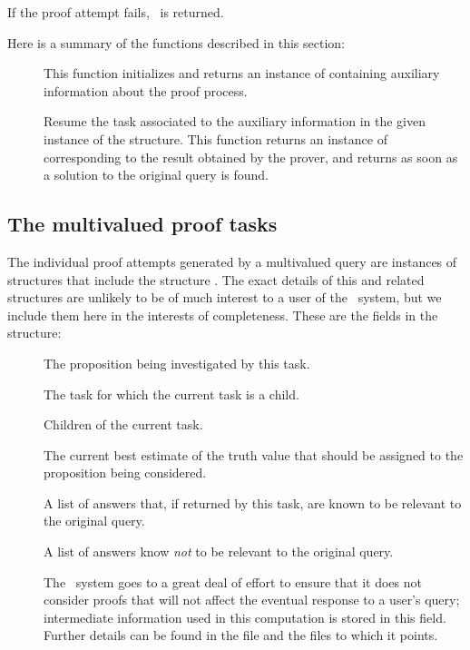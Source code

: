 If the proof attempt fails, \NIL\ is returned.

Here is a summary of the functions described in this section:

\begin{description}
 \item [] This function
initializes and returns an instance of  containing
auxiliary information about the proof process.
 \item [] Resume the task associated to the
auxiliary information in the given instance of the 
structure.  This function returns an instance of 
corresponding to the result obtained by the prover, and returns as
soon as a solution to the original query is found.
 \end{description}

\subsection{The multivalued proof tasks}
\label{s.consider}

The individual proof attempts generated by a multivalued query are
instances of structures that include the structure
.  The exact details of this
and related structures are unlikely to be of much interest to a user
of the \mvl\ system, but we include them here in the interests of
completeness.  These are the fields in the
 structure:
 \begin{description}
 \item [] The proposition being investigated by this task.
 \item [] The task for which the current task is a
child.
 \item [] Children of the current task.
 \item [] The current best estimate of the truth value
that should be assigned to the proposition being considered.
 \item [] A list of answers that, if returned by this
task, are known to be relevant to the original query.
 \item [] A list of answers know {\em not\/} to be
relevant to the original query.
 \item [] The \mvl\ system goes to a great deal of effort
to ensure that it does not consider proofs that will not affect the
eventual response to a user's query; intermediate information used in
this computation is stored in this field.  Further details can be found
in the file  and the files to which it points.
 \end{description}

